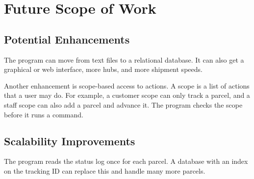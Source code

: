 \chapter{Future Scope of Work}

\section{Potential Enhancements}
The program can move from text files to a relational database. It can also
get a graphical or web interface, more hubs, and more shipment speeds.

Another enhancement is scope-based access to actions. A scope is a list of
actions that a user may do. For example, a customer scope can only track a
parcel, and a staff scope can also add a parcel and advance it. The program
checks the scope before it runs a command.

\section{Scalability Improvements}
The program reads the status log once for each parcel. A database with an
index on the tracking ID can replace this and handle many more parcels.
